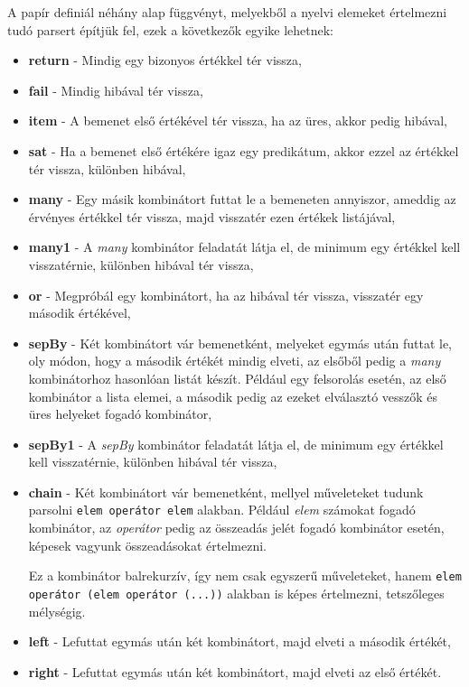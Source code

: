 A papír definiál néhány alap függvényt, melyekből a nyelvi elemeket értelmezni tudó parsert építjük fel, ezek a következők egyike lehetnek:

\begin{itemize}
    \item \textbf{return} - Mindig egy bizonyos értékkel tér vissza,
    \item \textbf{fail} - Mindig hibával tér vissza,
    \item \textbf{item} - A bemenet első értékével tér vissza, ha az üres, akkor pedig hibával,
    \item \textbf{sat} - Ha a bemenet első értékére igaz egy predikátum, akkor ezzel az értékkel tér vissza, különben hibával,
    \item \textbf{many} - Egy másik kombinátort futtat le a bemeneten annyiszor, ameddig az érvényes értékkel tér vissza, majd visszatér ezen értékek listájával,
    \item \textbf{many1} - A \textit{many} kombinátor feladatát látja el, de minimum egy értékkel kell visszatérnie, különben hibával tér vissza,
    \item \textbf{or} - Megpróbál egy kombinátort, ha az hibával tér vissza, visszatér egy második értékével,
    \item \textbf{sepBy} - Két kombinátort vár bemenetként, melyeket egymás után futtat le, oly módon, hogy a második értékét mindig elveti, az elsőből pedig a \textit{many} kombinátorhoz hasonlóan listát készít. Például egy felsorolás esetén, az első kombinátor a lista elemei, a második pedig az ezeket elválasztó vesszők és üres helyeket fogadó kombinátor,
    \item \textbf{sepBy1} - A \textit{sepBy} kombinátor feladatát látja el, de minimum egy értékkel kell visszatérnie, különben hibával tér vissza,
    \item \textbf{chain} - Két kombinátort vár bemenetként, mellyel műveleteket tudunk parsolni \verb_elem operátor elem_ alakban. Például \textit{elem} számokat fogadó kombinátor, az \textit{operátor} pedig az összeadás jelét fogadó kombinátor esetén, képesek vagyunk összeadásokat értelmezni.
    
    Ez a kombinátor balrekurzív, így nem csak egyszerű műveleteket, hanem \texttt{elem operátor (elem operátor (...))} alakban is képes értelmezni, tetszőleges mélységig.
    \item \textbf{left} - Lefuttat egymás után két kombinátort, majd elveti a második értékét,
    \item \textbf{right} - Lefuttat egymás után két kombinátort, majd elveti az első értékét.
\end{itemize}


